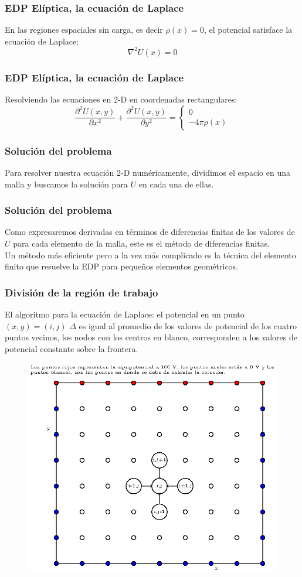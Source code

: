 \documentclass[12pt]{beamer}
\begin{document}
\begin{frame}
\frametitle{EDP Elíptica, la ecuación de Laplace}
En las regiones espaciales sin carga, es decir $\rho(x)=0$, el potencial satisface la ecuación de Laplace:
\[ \nabla^{2} U(x) = 0\]
\end{frame}
\begin{frame}
\frametitle{EDP Elíptica, la ecuación de Laplace}
Resolviendo las ecuaciones en 2-D en coordenadas rectangulares:
\[ \dfrac{\partial^{2} U(x,y)}{\partial x^{2}} + \dfrac{\partial^{2} U(x,y)}{\partial y^{2}}  = \left\lbrace \begin{array}{l}
0 \\
- 4\pi \rho(x)
\end{array} \right. \]
\end{frame}
\begin{frame}
\frametitle{Solución del problema}
Para resolver nuestra ecuación 2-D numéricamente, dividimos el espacio en una malla y buscamos la solución para $U$ en cada una de ellas.
\end{frame}
\begin{frame}
\frametitle{Solución del problema}
Como expresaremos derivadas en términos de diferencias finitas de los valores de $U$ para cada elemento de la malla, este es el método de diferencias finitas.
\\
\bigskip
Un método más eficiente pero a la vez más complicado es la técnica del elemento finito que resuelve la EDP para pequeños elementos geométricos.
\end{frame}
\begin{frame}
\frametitle{División de la región de trabajo}
El algoritmo para la ecuación de Laplace: el potencial en un punto $(x,y) = (i,j)$ $\Delta$ es igual al promedio de los valores de potencial de los cuatro puntos vecinos, los nodos con los centros en blanco, corresponden a los valores de potencial constante sobre la frontera.
\end{frame}
{
\begin{frame}[plain]
\begin{figure}
	\centering
	\includegraphics[scale=0.6]{Imagenes/mallaSolucionEDP_03.eps}
\end{figure}
\end{frame}
}
\end{document}
